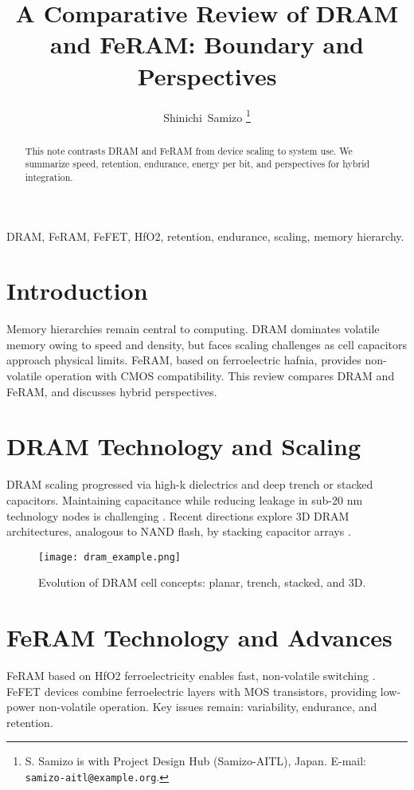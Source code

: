\documentclass[journal]{IEEEtran}
\title{A Comparative Review of DRAM and FeRAM: Boundary and Perspectives}
\author{Shinichi~Samizo%
\thanks{S. Samizo is with Project Design Hub (Samizo-AITL), Japan. 
E-mail: \texttt{samizo-aitl@example.org}.}
}
\begin{document}
\maketitle

\begin{abstract}
This note contrasts DRAM and FeRAM from device scaling to system use. 
We summarize speed, retention, endurance, energy per bit, and perspectives 
for hybrid integration.
\end{abstract}

\begin{IEEEkeywords}
DRAM, FeRAM, FeFET, HfO2, retention, endurance, scaling, memory hierarchy.
\end{IEEEkeywords}

\section{Introduction}
Memory hierarchies remain central to computing. DRAM dominates volatile 
memory owing to speed and density, but faces scaling challenges as cell 
capacitors approach physical limits. FeRAM, based on ferroelectric hafnia, 
provides non-volatile operation with CMOS compatibility. This review 
compares DRAM and FeRAM, and discusses hybrid perspectives.

\section{DRAM Technology and Scaling}
DRAM scaling progressed via high-k dielectrics and deep trench or stacked 
capacitors. Maintaining capacitance while reducing leakage in sub-20 nm 
technology nodes is challenging \cite{choi2022}. 
Recent directions explore 3D DRAM architectures, analogous to NAND flash, 
by stacking capacitor arrays \cite{kim2021_dram}.

\begin{figure}[!t]
\centering
\texttt{[image: dram\_example.png]}
\caption{Evolution of DRAM cell concepts: planar, trench, stacked, and 3D.}
\label{fig:dram}
\end{figure}

\section{FeRAM Technology and Advances}
FeRAM based on HfO2 ferroelectricity enables fast, non-volatile switching 
\cite{boscke2011,mueller2012}. FeFET devices combine ferroelectric layers 
with MOS transistors, providing low-power non-volatile operation. 
Key issues remain: variability, endurance, and retention.
\end{document}

